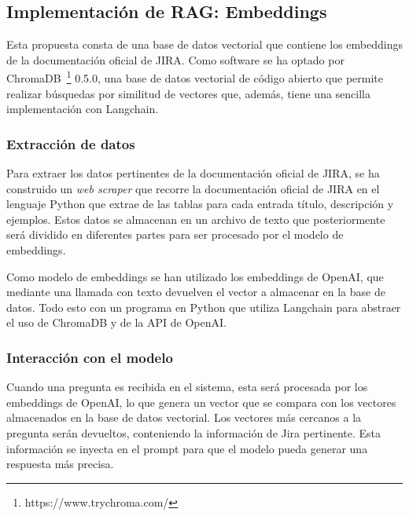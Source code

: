 \subsection{Implementación de RAG: Embeddings}
Esta propuesta consta de una base de datos vectorial que contiene los embeddings de la documentación oficial de JIRA. Como software se ha optado por ChromaDB~\footnote{https://www.trychroma.com/} 0.5.0, una base de datos vectorial de código abierto que permite realizar búsquedas por similitud de vectores que, además, tiene una sencilla implementación con Langchain.

\subsubsection{Extracción de datos}
Para extraer los datos pertinentes de la documentación oficial de JIRA, se ha construido un \textit{web scraper} que recorre la documentación oficial de JIRA en el lenguaje Python que extrae de las tablas para cada entrada título, descripción y ejemplos. Estos datos se almacenan en un archivo de texto que posteriormente será dividido en diferentes partes para ser procesado por el modelo de embeddings.

Como modelo de embeddings se han utilizado los embeddings de OpenAI, que mediante una llamada con texto devuelven el vector a almacenar en la base de datos. Todo esto con un programa en Python que utiliza Langchain para abstraer el uso de ChromaDB y de la API de OpenAI.

\subsubsection{Interacción con el modelo}
Cuando una pregunta es recibida en el sistema, esta será procesada por los embeddings de OpenAI, lo que genera un vector que se compara con los vectores almacenados en la base de datos vectorial. Los vectores más cercanos a la pregunta serán devueltos, conteniendo la información de Jira pertinente. Esta información se inyecta en el prompt para que el modelo pueda generar una respuesta más precisa.